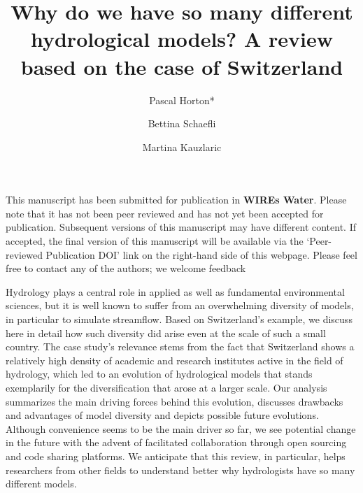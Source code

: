 \documentclass[10pt,a4paper]{article}
\renewenvironment{abstract}
 {{\bfseries\noindent{\abstractname}\par\nobreak}\footnotesize}
 {\bigskip}
\begin{document}
\title{Why do we have so many different hydrological models? A review based on the case of Switzerland}


\author[1]{Pascal Horton*}
\author[1]{Bettina Schaefli}
\author[1]{Martina Kauzlaric}


 \date{}


\ifdefined\preprint
\setcounter{page}{0}
\hrulefill

This manuscript has been submitted for publication in \textbf{WIREs Water}. Please note that it has not been peer reviewed and has not yet been accepted for publication. Subsequent versions of this manuscript may have different content. If accepted, the final version of this manuscript will be available via the ‘Peer-reviewed Publication DOI’ link on the right-hand side of this webpage. Please feel free to contact any of the authors; we welcome feedback

\hrulefill
\newpage
\fi

\begingroup
\maketitle
\endgroup




\begin{abstract}
Hydrology plays a central role in applied as well as fundamental environmental sciences, but it is well known to suffer from an overwhelming diversity of models, in particular to simulate streamflow. Based on Switzerland's example, we discuss here in detail how such diversity did arise even at the scale of such a small country. The case study's relevance stems from the fact that Switzerland shows a relatively high density of academic and research institutes active in the field of hydrology, which led to an evolution of hydrological models that stands exemplarily for the diversification that arose at a larger scale. Our analysis summarizes the main driving forces behind this evolution, discusses drawbacks and advantages of model diversity and depicts possible future evolutions. Although convenience seems to be the main driver so far, we see potential change in the future with the advent of facilitated collaboration through open sourcing and code sharing platforms. We anticipate that this review, in particular, helps researchers from other fields to understand better why hydrologists have so many different models.
\end{abstract}%
\end{document}
